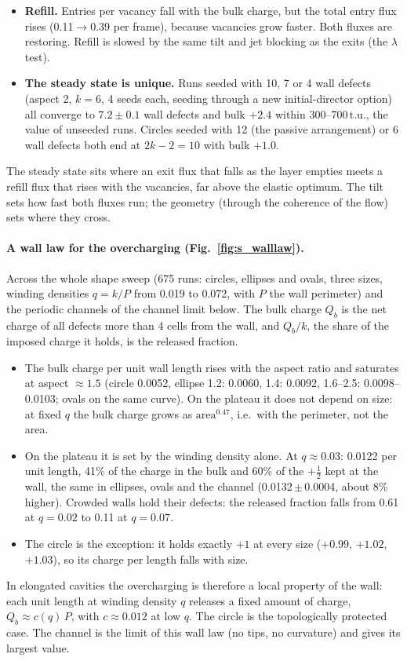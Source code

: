 \documentclass[aps,prl,onecolumn,superscriptaddress,amsmath,amssymb,nofootinbib]{revtex4-2}
\newcommand{\half}{\tfrac12}
\begin{document}
\begin{itemize}
\begin{itemize}
        \end{itemize}
  \item \textbf{Refill.} Entries per vacancy fall with the bulk charge, but the total entry flux rises (0.11$\to$0.39 per frame), because vacancies grow faster. Both fluxes are restoring.
        Refill is slowed by the same tilt and jet blocking as the exits (the $\lambda$ test).
  \item \textbf{The steady state is unique.} Runs seeded with 10, 7 or 4 wall defects (aspect 2, $k=6$, 4 seeds each, seeding through a new initial-director option) all converge to
        $7.2\pm0.1$ wall defects and bulk $+2.4$ within 300--700\,t.u., the value of unseeded runs. Circles seeded with 12 (the passive arrangement) or 6 wall defects both end at $2k-2=10$ with bulk $+1.0$.
\end{itemize}
The steady state sits where an exit flux that falls as the layer empties meets a refill flux that rises with the vacancies, far above the elastic optimum. The tilt sets how fast both
fluxes run; the geometry (through the coherence of the flow) sets where they cross.

\paragraph{A wall law for the overcharging (Fig.~\ref{fig:s_walllaw}).} Across the whole shape sweep (675 runs: circles, ellipses and ovals, three sizes, winding densities
$q=k/P$ from 0.019 to 0.072, with $P$ the wall perimeter) and the periodic channels of the channel limit below. The bulk charge $Q_b$ is the net charge of all defects more than
4 cells from the wall, and $Q_b/k$, the share of the imposed charge it holds, is the released fraction.
\begin{itemize}
  \item The bulk charge per unit wall length rises with the aspect ratio and saturates at aspect $\approx1.5$ (circle 0.0052, ellipse 1.2: 0.0060, 1.4: 0.0092, 1.6--2.5: 0.0098--0.0103;
        ovals on the same curve). On the plateau it does not depend on size: at fixed $q$ the bulk charge grows as $\text{area}^{0.47}$, i.e.\ with the perimeter, not the area.
  \item On the plateau it is set by the winding density alone. At $q\approx0.03$: 0.0122 per unit length, 41\% of the charge in the bulk and 60\% of the $+\half$ kept at the wall, the same in
        ellipses, ovals and the channel (0.0132\,$\pm$\,0.0004, about 8\% higher). Crowded walls hold their defects: the released fraction falls from 0.61 at $q=0.02$ to 0.11 at $q=0.07$.
  \item The circle is the exception: it holds exactly $+1$ at every size ($+0.99$, $+1.02$, $+1.03$), so its charge per length falls with size.
\end{itemize}
In elongated cavities the overcharging is therefore a local property of the wall: each unit length at winding density $q$ releases a fixed amount of charge, $Q_b\approx c(q)\,P$, with
$c\approx0.012$ at low $q$. The circle is the topologically protected case. The channel is the limit of this wall law (no tips, no curvature) and gives its largest value.
\end{document}
